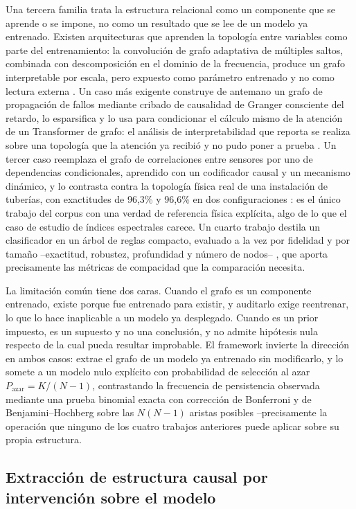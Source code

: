 Una tercera familia trata la estructura relacional como un componente que se aprende o se impone, no como un resultado que se lee de un modelo ya entrenado. Existen arquitecturas que aprenden la topología entre variables como parte del entrenamiento: la convolución de grafo adaptativa de múltiples saltos, combinada con descomposición en el dominio de la frecuencia, produce un grafo interpretable por escala, pero expuesto como parámetro entrenado y no como lectura externa \cite{cai2024msgnet}. Un caso más exigente construye de antemano un grafo de propagación de fallos mediante cribado de causalidad de Granger consciente del retardo, lo esparsifica y lo usa para condicionar el cálculo mismo de la atención de un Transformer de grafo: el análisis de interpretabilidad que reporta se realiza sobre una topología que la atención ya recibió y no pudo poner a prueba \cite{zhao2026causalguided}. Un tercer caso reemplaza el grafo de correlaciones entre sensores por uno de dependencias condicionales, aprendido con un codificador causal y un mecanismo dinámico, y lo contrasta contra la topología física real de una instalación de tuberías, con exactitudes de 96,3\% y 96,6\% en dos configuraciones \cite{pipeline2026causalgraph}: es el único trabajo del corpus con una verdad de referencia física explícita, algo de lo que el caso de estudio de índices espectrales carece. Un cuarto trabajo destila un clasificador en un árbol de reglas compacto, evaluado a la vez por fidelidad y por tamaño --exactitud, robustez, profundidad y número de nodos-- \cite{rulexai2024events}, que aporta precisamente las métricas de compacidad que la comparación necesita.

La limitación común tiene dos caras. Cuando el grafo es un componente entrenado, existe porque fue entrenado para existir, y auditarlo exige reentrenar, lo que lo hace inaplicable a un modelo ya desplegado. Cuando es un prior impuesto, es un supuesto y no una conclusión, y no admite hipótesis nula respecto de la cual pueda resultar improbable. El framework invierte la dirección en ambos casos: extrae el grafo de un modelo ya entrenado sin modificarlo, y lo somete a un modelo nulo explícito con probabilidad de selección al azar $P_{\text{azar}} = K/(N-1)$, contrastando la frecuencia de persistencia observada mediante una prueba binomial exacta con corrección de Bonferroni y de Benjamini--Hochberg sobre las $N(N-1)$ aristas posibles --precisamente la operación que ninguno de los cuatro trabajos anteriores puede aplicar sobre su propia estructura.

\subsection{Extracción de estructura causal por intervención sobre el modelo}

